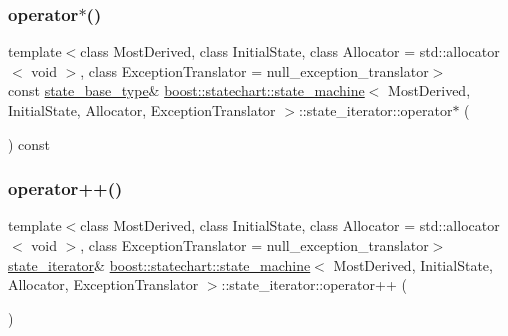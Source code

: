 \subsubsection{\texorpdfstring{operator$\ast$()}{operator*()}}
{\footnotesize\ttfamily template$<$class Most\+Derived, class Initial\+State, class Allocator = std\+::allocator$<$ void $>$, class Exception\+Translator = null\+\_\+exception\+\_\+translator$>$ \\
const \mbox{\hyperlink{classboost_1_1statechart_1_1state__machine_a69cc258c29fcabec25c5dc8bedb7d530}{state\+\_\+base\+\_\+type}}\& \mbox{\hyperlink{classboost_1_1statechart_1_1state__machine}{boost\+::statechart\+::state\+\_\+machine}}$<$ Most\+Derived, Initial\+State, Allocator, Exception\+Translator $>$\+::state\+\_\+iterator\+::operator$\ast$ (\begin{DoxyParamCaption}{ }\end{DoxyParamCaption}) const\hspace{0.3cm}{\ttfamily [inline]}}

\mbox{\label{classboost_1_1statechart_1_1state__machine_1_1state__iterator_ae817393c393e5ef27ab9c99a2419ae79}} 
\subsubsection{\texorpdfstring{operator++()}{operator++()}\hspace{0.1cm}{\footnotesize\ttfamily [1/2]}}
{\footnotesize\ttfamily template$<$class Most\+Derived, class Initial\+State, class Allocator = std\+::allocator$<$ void $>$, class Exception\+Translator = null\+\_\+exception\+\_\+translator$>$ \\
\mbox{\hyperlink{classboost_1_1statechart_1_1state__machine_1_1state__iterator}{state\+\_\+iterator}}\& \mbox{\hyperlink{classboost_1_1statechart_1_1state__machine}{boost\+::statechart\+::state\+\_\+machine}}$<$ Most\+Derived, Initial\+State, Allocator, Exception\+Translator $>$\+::state\+\_\+iterator\+::operator++ (\begin{DoxyParamCaption}{ }\end{DoxyParamCaption})\hspace{0.3cm}{\ttfamily [inline]}}

